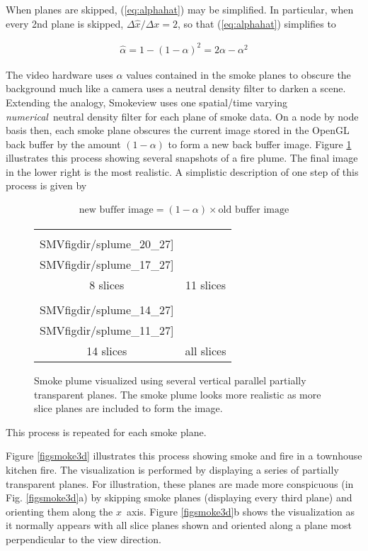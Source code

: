{When planes are skipped, (\ref{eq:alphahat}) may be simplified.
In particular, when every 2nd plane is skipped,
$\Delta\hat{x}/\Delta x=2$, so that (\ref{eq:alphahat}) simplifies
to

\begin{eqnarray}
\hat{\alpha}=1-(1-\alpha)^2=2\alpha-\alpha^2
\end{eqnarray}

The video hardware uses $\alpha$ values contained in the smoke
planes to obscure the background much like a camera uses a neutral
density filter to darken a scene.  Extending the analogy,
Smokeview uses one spatial/time varying {\em numerical}\ neutral
density filter for each plane of smoke data.  On a node by node
basis then, each smoke plane obscures the current image stored in
the OpenGL back buffer by the amount $(1-\alpha)$ to form a new
back buffer image.  Figure \ref{figplume} illustrates this process
showing several snapshots of a fire plume. The final image in the
lower right is the most realistic. A simplistic description of one
step of this process is given by

\begin{eqnarray}
\mbox{new buffer image} = (1-\alpha)\times \mbox{old buffer image}
\end{eqnarray}

\begin{figure}[bph]
\begin{center}
\begin{tabular}{cc}
\texttt{[image: \\SMVfigdir/splume\_20\_27]}&
\texttt{[image: \\SMVfigdir/splume\_17\_27]}\\
8 slices&11 slices\\
\texttt{[image: \\SMVfigdir/splume\_14\_27]}&
\texttt{[image: \\SMVfigdir/splume\_11\_27]}\\
14 slices&all slices
\end{tabular}
\end{center}
\caption [Smoke plume visualized using several vertical parallel
partially transparent planes.] {Smoke plume visualized using
several vertical parallel partially transparent planes. The smoke
plume looks more realistic as more slice planes are included to
form the image. } \label{figplume}
\end{figure}

\noindent This process is repeated for each smoke plane.

Figure \ref{figsmoke3d} illustrates this process showing smoke and
fire in a townhouse kitchen fire. The visualization is performed
by displaying a series of partially transparent planes. For
illustration, these planes are made more conspicuous (in Fig.
\ref{figsmoke3d}a) by skipping smoke planes (displaying every
third plane) and orienting them along the $x$~axis. Figure
\ref{figsmoke3d}b shows the visualization as it normally appears
with all slice planes shown and oriented along a plane most
perpendicular to the view direction.

}
